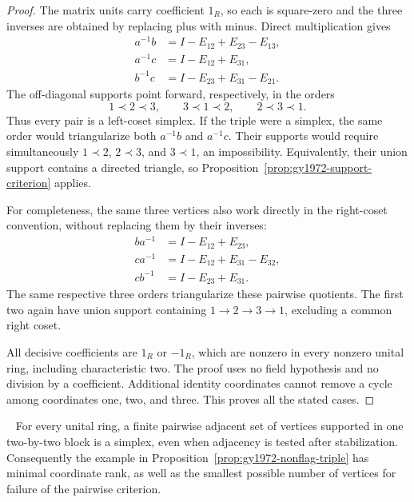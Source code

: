 \begin{proof}
The matrix units carry coefficient \(1_R\), so each is square-zero and
the three inverses are obtained by replacing plus with minus. Direct
multiplication gives
\[
\begin{aligned}
 a^{-1}b&=I-E_{12}+E_{23}-E_{13},\\
 a^{-1}c&=I-E_{12}+E_{31},\\
 b^{-1}c&=I-E_{23}+E_{31}-E_{21}.
\end{aligned}
\]
The off-diagonal supports point forward, respectively, in the orders
\[
             1\prec2\prec3,\qquad
             3\prec1\prec2,\qquad
             2\prec3\prec1.
\]
Thus every pair is a left-coset simplex. If the triple were a simplex,
the same order would triangularize both \(a^{-1}b\) and \(a^{-1}c\).
Their supports would require simultaneously
\(1\prec2\), \(2\prec3\), and \(3\prec1\), an impossibility.
Equivalently, their union support contains a directed triangle, so
Proposition~\ref{prop:gy1972-support-criterion} applies.

For completeness, the same three vertices also work directly in the
right-coset convention, without replacing them by their inverses:
\[
\begin{aligned}
 ba^{-1}&=I-E_{12}+E_{23},\\
 ca^{-1}&=I-E_{12}+E_{31}-E_{32},\\
 cb^{-1}&=I-E_{23}+E_{31}.
\end{aligned}
\]
The same respective three orders triangularize these pairwise
quotients. The first two again have union support containing
\(1\to2\to3\to1\), excluding a common right coset.

All decisive coefficients are \(1_R\) or \(-1_R\), which are nonzero
in every nonzero unital ring, including characteristic two. The proof
uses no field hypothesis and no division by a coefficient. Additional
identity coordinates cannot remove a cycle among coordinates one,
two, and three. This proves all the stated cases.
\end{proof}

\begin{proposition}\ours\ 
\label{prop:gy1972-rank-minimal}
For every unital ring, a finite pairwise adjacent set of vertices
supported in one two-by-two block is a simplex, even when adjacency is
tested after stabilization. Consequently the example in
Proposition~\ref{prop:gy1972-nonflag-triple} has minimal coordinate rank,
as well as the smallest possible number of vertices for failure of the
pairwise criterion.
\end{proposition}

